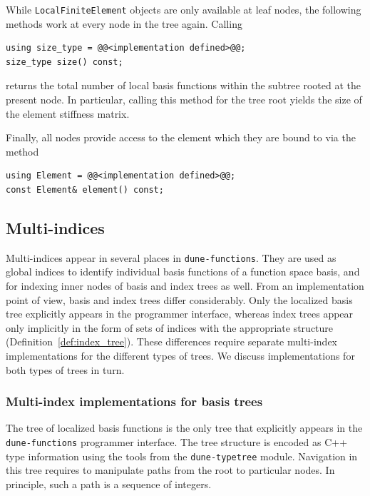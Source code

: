 \documentclass[a4paper,10pt,headings=normal,bibliography=totoc]{scrartcl}
\newcommand{\cpp}[1]{\lstinline[basicstyle=\ttfamily]!#1!}
\newcommand{\dunemodule}[1]{\texttt{#1}}
\begin{document}
While \cpp{LocalFiniteElement} objects are only available at leaf nodes,
the following methods work at every node in the tree again.
Calling
\begin{lstlisting}[style=Interface]
using size_type = @@<implementation defined>@@;
size_type size() const;
\end{lstlisting}
returns the total number of
local basis functions within the subtree rooted at the
present node.  In particular, calling this method for the tree root
yields the size of the element stiffness matrix.

Finally, all nodes provide access to the
element which they are bound
to via the method
\begin{lstlisting}[style=Interface]
using Element = @@<implementation defined>@@;
const Element& element() const;
\end{lstlisting}



\subsection{Multi-indices}
\label{sec:multi_indices}
Multi-indices appear in several places in \dunemodule{dune-functions}.
They are used as global indices to identify individual
basis functions of a function space basis, and for indexing
inner nodes of basis and index trees as well.
From an implementation point of view, basis and index trees differ
considerably. Only the localized basis tree explicitly appears
in the programmer interface, whereas index trees appear only implicitly
in the form of sets of indices with the appropriate structure (Definition~\ref{def:index_tree}).
These differences require separate multi-index
implementations for the different types of trees.  We discuss implementations
for both types of trees in turn.

\subsubsection{Multi-index implementations for basis trees}

The tree of localized basis functions is the only tree that explicitly appears
in the \dunemodule{dune-functions} programmer interface. The tree structure
is encoded as C++ type information using the tools from the \dunemodule{dune-typetree}
module. Navigation in this tree requires to manipulate paths from the root to
particular nodes.  In principle, such a path is a sequence of integers.
\end{document}
